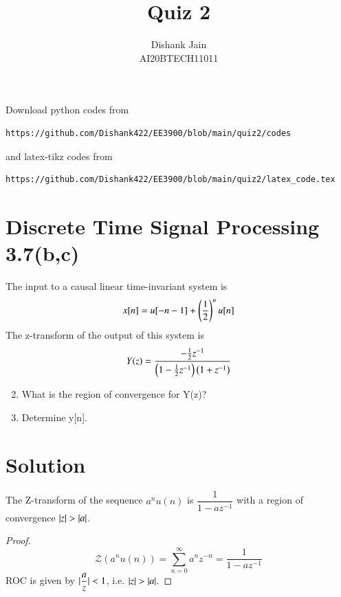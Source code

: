 \documentclass[journal,12pt,twocolumn]{IEEEtran}
\begin{document}
     \def\centbox#1{\makebox[0in]{#1}}
     \def\topbox#1{\raisebox{-\baselineskip}[0in][0in]{#1}}
     \def\midbox#1{\raisebox{-0.5\baselineskip}[0in][0in]{#1}}
\vspace{3cm}
\title{Quiz 2}
\author{Dishank Jain \\ AI20BTECH11011}
\maketitle
\newpage
\bigskip
\renewcommand{\thefigure}{\theenumi}
\renewcommand{\thetable}{\theenumi}
Download python codes from
%
\begin{lstlisting}
https://github.com/Dishank422/EE3900/blob/main/quiz2/codes
\end{lstlisting}
%
and latex-tikz codes from 
%
\begin{lstlisting}
https://github.com/Dishank422/EE3900/blob/main/quiz2/latex_code.tex
\end{lstlisting}
%
\section{Discrete Time Signal Processing 3.7(b,c)}
The input to a causal linear time-invariant system is
\begin{equation}
    x[n] = u[-n-1]+\left(\dfrac{1}{2}\right)^nu[n]
\end{equation}
The z-transform of the output of this system is 
\begin{equation}
    Y(z) = \dfrac{-\frac{1}{2}z^{-1}}{\left(1-\frac{1}{2}z^{-1}\right)\left(1+z^{-1}\right)}
\end{equation}
\begin{enumerate}[label=(\alph*)]
\setcounter{enumi}{1}
    \item What is the region of convergence for Y(z)?
    \item Determine y[n].
\end{enumerate}

\section{Solution}
\begin{lemma}
The Z-transform of the sequence $a^nu(n)$ is $\dfrac{1}{1-az^{-1}}$ with a region of convergence $\vert z\vert > \vert a\vert$.
\label{l1}
\end{lemma}
\begin{proof}
\begin{equation}
    \mathcal{Z}(a^nu(n)) = \sum_{n=0}^{\infty}a^nz^{-n} = \dfrac{1}{1-az^{-1}}
\end{equation}
ROC is given by $\vert\dfrac{a}{z}\vert < 1$, i.e. $\vert z\vert > \vert a\vert$.
\end{proof}
\end{document}
